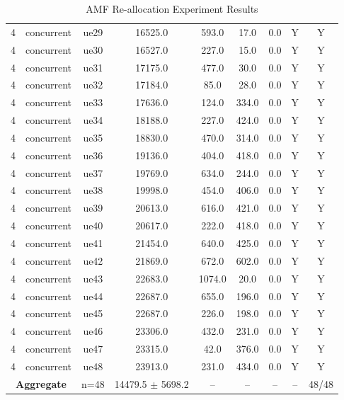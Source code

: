 \begin{table}[ht]
\begin{tabular}{|c|c|c|c|c|c|c|c|c|}
4 & concurrent & ue29 & 16525.0 & 593.0 & 17.0 & 0.0 & Y & Y \\
4 & concurrent & ue30 & 16527.0 & 227.0 & 15.0 & 0.0 & Y & Y \\
4 & concurrent & ue31 & 17175.0 & 477.0 & 30.0 & 0.0 & Y & Y \\
4 & concurrent & ue32 & 17184.0 & 85.0 & 28.0 & 0.0 & Y & Y \\
4 & concurrent & ue33 & 17636.0 & 124.0 & 334.0 & 0.0 & Y & Y \\
4 & concurrent & ue34 & 18188.0 & 227.0 & 424.0 & 0.0 & Y & Y \\
4 & concurrent & ue35 & 18830.0 & 470.0 & 314.0 & 0.0 & Y & Y \\
4 & concurrent & ue36 & 19136.0 & 404.0 & 418.0 & 0.0 & Y & Y \\
4 & concurrent & ue37 & 19769.0 & 634.0 & 244.0 & 0.0 & Y & Y \\
4 & concurrent & ue38 & 19998.0 & 454.0 & 406.0 & 0.0 & Y & Y \\
4 & concurrent & ue39 & 20613.0 & 616.0 & 421.0 & 0.0 & Y & Y \\
4 & concurrent & ue40 & 20617.0 & 222.0 & 418.0 & 0.0 & Y & Y \\
4 & concurrent & ue41 & 21454.0 & 640.0 & 425.0 & 0.0 & Y & Y \\
4 & concurrent & ue42 & 21869.0 & 672.0 & 602.0 & 0.0 & Y & Y \\
4 & concurrent & ue43 & 22683.0 & 1074.0 & 20.0 & 0.0 & Y & Y \\
4 & concurrent & ue44 & 22687.0 & 655.0 & 196.0 & 0.0 & Y & Y \\
4 & concurrent & ue45 & 22687.0 & 226.0 & 198.0 & 0.0 & Y & Y \\
4 & concurrent & ue46 & 23306.0 & 432.0 & 231.0 & 0.0 & Y & Y \\
4 & concurrent & ue47 & 23315.0 & 42.0 & 376.0 & 0.0 & Y & Y \\
4 & concurrent & ue48 & 23913.0 & 231.0 & 434.0 & 0.0 & Y & Y \\
\multicolumn{2}{|c|}{\textbf{Aggregate}} & n=48 & 14479.5 $\pm$ 5698.2 & -- & -- & -- & -- & 48/48 \\
\hline
\end{tabular}
\caption{AMF Re-allocation Experiment Results}
\label{tab:amf_realloc}
\end{table}
